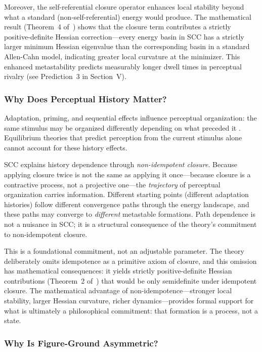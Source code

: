 \documentclass[lettersize,journal]{IEEEtran}
\begin{document}
Moreover, the self-referential closure operator enhances local stability beyond what a standard (non-self-referential) energy would produce. The mathematical result (Theorem~4 of~\cite{paper1}) shows that the closure term contributes a strictly positive-definite Hessian correction---every energy basin in SCC has a strictly larger minimum Hessian eigenvalue than the corresponding basin in a standard Allen-Cahn model, indicating greater local curvature at the minimizer. This enhanced metastability predicts measurably longer dwell times in perceptual rivalry (see Prediction~3 in Section~V).

\subsubsection{Why Does Perceptual History Matter?}

Adaptation, priming, and sequential effects influence perceptual organization: the same stimulus may be organized differently depending on what preceded it \cite{leopold2002stable}. Equilibrium theories that predict perception from the current stimulus alone cannot account for these history effects.

SCC explains history dependence through \emph{non-idempotent closure}. Because applying closure twice is not the same as applying it once---because closure is a contractive process, not a projective one---the \emph{trajectory} of perceptual organization carries information. Different starting points (different adaptation histories) follow different convergence paths through the energy landscape, and these paths may converge to \emph{different} metastable formations. Path dependence is not a nuisance in SCC; it is a structural consequence of the theory's commitment to non-idempotent closure.

This is a foundational commitment, not an adjustable parameter. The theory deliberately omits idempotence as a primitive axiom of closure, and this omission has mathematical consequences: it yields strictly positive-definite Hessian contributions (Theorem~2 of~\cite{paper1}) that would be only semidefinite under idempotent closure. The mathematical advantage of non-idempotence---stronger local stability, larger Hessian curvature, richer dynamics---provides formal support for what is ultimately a philosophical commitment: that formation is a process, not a state.

\subsubsection{Why Is Figure-Ground Asymmetric?}
\end{document}
